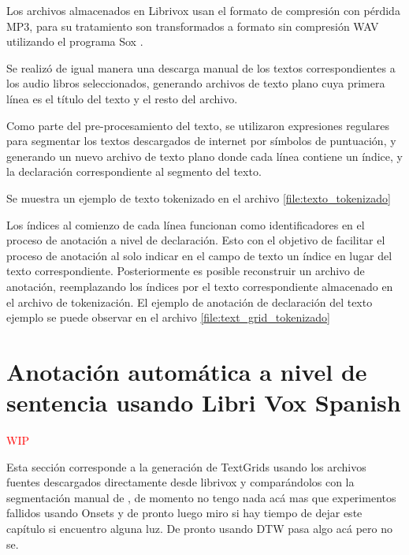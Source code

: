 \documentclass[a4paper,12pt,twoside]{report}
\begin{document}
Los archivos almacenados en Librivox usan el formato de compresión con pérdida MP3, para su tratamiento son transformados a formato sin compresión WAV utilizando el programa Sox \cite{Sox}.

Se realizó de igual manera una descarga manual de los textos correspondientes a los audio libros seleccionados, generando archivos de texto plano cuya primera línea es el título del texto y el resto del archivo.

Como parte del pre-procesamiento del texto, se utilizaron expresiones regulares para segmentar los textos descargados de internet por símbolos de puntuación, y generando un nuevo archivo de texto plano donde cada línea contiene un índice, y la declaración correspondiente al segmento del texto.

Se muestra un ejemplo de texto tokenizado en el archivo \ref{file:texto_tokenizado}



Los índices al comienzo de cada línea funcionan como identificadores en el proceso de anotación a nivel de declaración. Esto con el objetivo de facilitar el proceso de anotación al solo indicar en el campo de texto un índice en lugar del texto correspondiente. Posteriormente es posible reconstruir un archivo de anotación, reemplazando los índices por el texto correspondiente almacenado en el archivo de tokenización. El ejemplo de anotación de declaración del texto ejemplo se puede observar en el archivo \ref{file:text_grid_tokenizado}




\section{Anotación automática a nivel de sentencia usando Libri Vox Spanish}

\textcolor{red}{WIP}

Esta sección corresponde a la generación de TextGrids usando los archivos fuentes descargados directamente desde librivox y comparándolos con la segmentación manual de \cite{LibriVox-Spanish}, de momento no tengo nada acá mas que experimentos fallidos usando Onsets y de pronto luego miro si hay tiempo de dejar este capítulo si encuentro alguna luz. De pronto usando DTW pasa algo acá pero no se.
\end{document}
